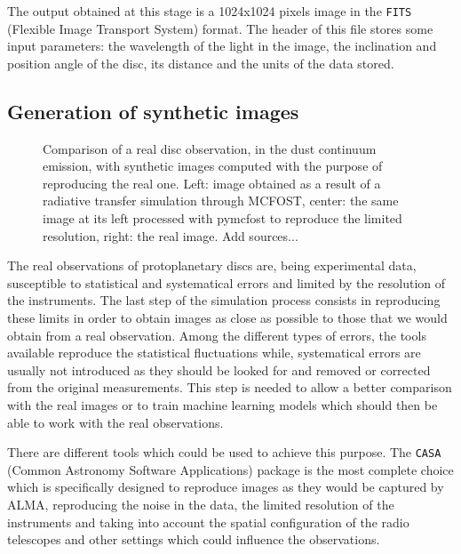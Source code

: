 \documentclass[a4paper,10pt]{report}
\begin{document}
The output obtained at this stage is a 1024x1024 pixels image in the
\lstinline{FITS} (Flexible Image Transport System) format.
The header of this file stores some input parameters: 
the wavelength of the light in the image, the inclination and position angle of
the disc, its distance and the units of the data stored.

\subsection{Generation of synthetic images}

\begin{figure}
    \begin{center}
        \scalebox{0.45}{}
    \end{center}
    \caption{Comparison of a real disc observation, in the dust continuum emission,
    with synthetic images computed with the purpose of reproducing the real one.
    Left: image obtained as a result of a radiative transfer simulation through MCFOST,
    center: the same image at its left processed with pymcfost to reproduce the limited
    resolution, right: the real image. Add sources...}
\end{figure}

The real observations of protoplanetary discs are, being experimental data, susceptible 
to statistical and systematical errors and limited by the resolution of the instruments.
The last step of the simulation process consists in reproducing these limits in order
to obtain images as close as possible to those that we would obtain from a real observation.
Among the different types of errors, the tools available reproduce the
statistical fluctuations while, systematical errors are usually not introduced as they should be 
looked for and removed or corrected from the original measurements.
This step is needed to allow a better comparison with the real images or to train machine learning 
models which should then be able to work with the real observations.

There are different tools which could be used to achieve this purpose.
The \lstinline{CASA} (Common Astronomy Software Applications) package \cite{casa} is the most complete choice 
which is specifically designed to reproduce images as they would be captured by ALMA, reproducing the noise in the data,
the limited resolution of the instruments and taking into account the spatial configuration of the radio telescopes
and other settings which could influence the observations.
\end{document}
